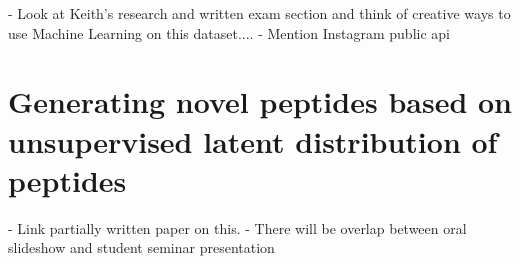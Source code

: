 - Look at Keith's research and written exam section and think of creative ways to use Machine Learning on this dataset....
- Mention Instagram public api

\section{Generating novel peptides based on unsupervised latent distribution of peptides}

- Link partially written paper on this.
- There will be overlap between oral slideshow and student seminar presentation

